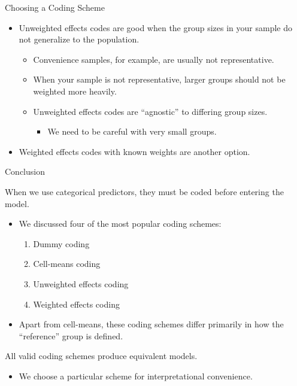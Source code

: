 \documentclass{beamer}\usepackage[]{graphicx}\usepackage[]{color}
\begin{document}
\begin{frame}[allowframebreaks]{Choosing a Coding Scheme}
\begin{itemize}
  \item Unweighted effects codes are good when the group sizes in your sample do
    not generalize to the population.
    \begin{itemize}
    \item Convenience samples, for example, are usually not representative.
      \vc
    \item When your sample is not representative, larger groups should not be 
      weighted more heavily.
      \vc
    \item Unweighted effects codes are ``agnostic'' to differing group sizes.
      \begin{itemize}
      \item We need to be careful with very small groups.
      \end{itemize}
    \end{itemize}
    \vc
  \item Weighted effects codes with known weights are another option.
  \end{itemize}
  
\end{frame}


\begin{frame}{Conclusion}
  
  When we use categorical predictors, they must be coded before entering the 
  model.
  \vc
  \begin{itemize}
  \item We discussed four of the most popular coding schemes:
    \begin{enumerate}
    \item Dummy coding
    \item Cell-means coding
    \item Unweighted effects coding
    \item Weighted effects coding
    \end{enumerate}
    \vc
  \item Apart from cell-means, these coding schemes differ primarily in how the 
    ``reference'' group is defined.
  \end{itemize}
  \vc
  All valid coding schemes produce equivalent models.
  \begin{itemize} 
    \item We choose a particular scheme for interpretational convenience.
  \end{itemize}
  
\end{frame}


\end{document}
